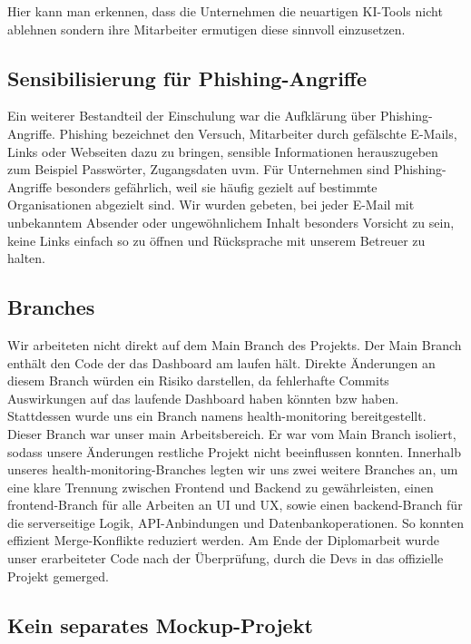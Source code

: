 Hier kann man erkennen, dass die Unternehmen die neuartigen KI-Tools nicht ablehnen sondern ihre Mitarbeiter ermutigen diese sinnvoll einzusetzen.


\subsection{Sensibilisierung für Phishing-Angriffe}

Ein weiterer Bestandteil der Einschulung war die Aufklärung über Phishing-Angriffe.
Phishing bezeichnet den Versuch, Mitarbeiter durch gefälschte E-Mails, Links oder Webseiten dazu zu bringen, sensible Informationen herauszugeben zum Beispiel Passwörter, Zugangsdaten uvm.
Für Unternehmen sind Phishing-Angriffe besonders gefährlich, weil sie häufig gezielt auf bestimmte Organisationen abgezielt sind.
Wir wurden gebeten, bei jeder E-Mail mit unbekanntem Absender oder ungewöhnlichem Inhalt besonders Vorsicht zu sein, keine Links einfach so zu öffnen und Rücksprache mit unserem Betreuer zu halten.

\subsection{Branches}
Wir arbeiteten nicht direkt auf dem Main Branch des Projekts.
Der Main Branch enthält den Code der das Dashboard am laufen hält.
Direkte Änderungen an diesem Branch würden ein Risiko darstellen, da fehlerhafte Commits Auswirkungen auf das laufende Dashboard haben könnten bzw haben.
Stattdessen wurde uns ein Branch namens health-monitoring bereitgestellt.
Dieser Branch war unser main Arbeitsbereich.
Er war vom Main Branch isoliert, sodass unsere Änderungen restliche Projekt nicht beeinflussen konnten.
Innerhalb unseres health-monitoring-Branches legten wir uns zwei weitere Branches an, um eine klare Trennung zwischen Frontend und Backend zu gewährleisten, einen frontend-Branch für alle Arbeiten an UI und UX, sowie einen backend-Branch für die serverseitige Logik, API-Anbindungen und Datenbankoperationen.
So konnten effizient Merge-Konflikte reduziert werden.
Am Ende der Diplomarbeit wurde unser erarbeiteter Code nach der Überprüfung, durch die Devs in das offizielle Projekt gemerged.

\subsection{Kein separates Mockup-Projekt}

